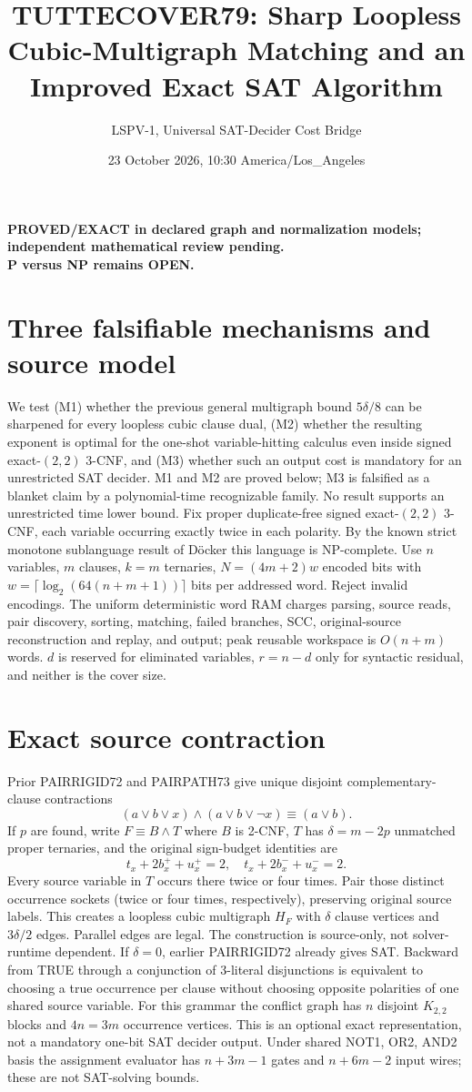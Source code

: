 \documentclass[11pt]{article}
\title{TUTTECOVER79: Sharp Loopless Cubic-Multigraph Matching and an Improved Exact SAT Algorithm}
\author{LSPV-1, Universal SAT-Decider Cost Bridge}
\date{23 October 2026, 10:30 America/Los\_Angeles}
\begin{document}
\maketitle
\begin{center}
\textbf{PROVED/EXACT in declared graph and normalization models; independent mathematical review pending.}\\
\textbf{P versus NP remains OPEN.}
\end{center}
\section{Three falsifiable mechanisms and source model}
We test (M1) whether the previous general multigraph bound $5\delta/8$ can be sharpened for every loopless cubic clause dual, (M2) whether the resulting exponent is optimal for the one-shot variable-hitting calculus even inside signed exact-$(2,2)$ 3-CNF, and (M3) whether such an output cost is mandatory for an unrestricted SAT decider. M1 and M2 are proved below; M3 is falsified as a blanket claim by a polynomial-time recognizable family. No result supports an unrestricted time lower bound.
Fix proper duplicate-free signed exact-$(2,2)$ 3-CNF, each variable occurring exactly twice in each polarity. By the known strict monotone sublanguage result of D\"ocker this language is NP-complete. Use $n$ variables, $m$ clauses, $k=m$ ternaries, $N=(4m+2)w$ encoded bits with $w=\lceil\log_2(64(n+m+1))\rceil$ bits per addressed word. Reject invalid encodings. The uniform deterministic word RAM charges parsing, source reads, pair discovery, sorting, matching, failed branches, SCC, original-source reconstruction and replay, and output; peak reusable workspace is $O(n+m)$ words. $d$ is reserved for eliminated variables, $r=n-d$ only for syntactic residual, and neither is the cover size.
\section{Exact source contraction}
Prior PAIRRIGID72 and PAIRPATH73 give unique disjoint complementary-clause contractions
\[
(a\vee b\vee x)\wedge(a\vee b\vee\neg x)\equiv(a\vee b).
\]
If $p$ are found, write $F\equiv B\wedge T$ where $B$ is 2-CNF, $T$ has $\delta=m-2p$ unmatched proper ternaries, and the original sign-budget identities are
\[
t_x+2b_x^+ +u_x^+=2,\quad
t_x+2b_x^- +u_x^-=2.
\]
Every source variable in $T$ occurs there twice or four times. Pair those distinct occurrence sockets (twice or four times, respectively), preserving original source labels. This creates a loopless cubic multigraph $H_F$ with $\delta$ clause vertices and $3\delta/2$ edges. Parallel edges are legal. The construction is source-only, not solver-runtime dependent. If $\delta=0$, earlier PAIRRIGID72 already gives SAT.
Backward from TRUE through a conjunction of 3-literal disjunctions is equivalent to choosing a true occurrence per clause without choosing opposite polarities of one shared source variable. For this grammar the conflict graph has $n$ disjoint $K_{2,2}$ blocks and $4n=3m$ occurrence vertices. This is an optional exact representation, not a mandatory one-bit SAT decider output. Under shared NOT1, OR2, AND2 basis the assignment evaluator has $n+3m-1$ gates and $n+6m-2$ input wires; these are not SAT-solving bounds.
\end{document}
